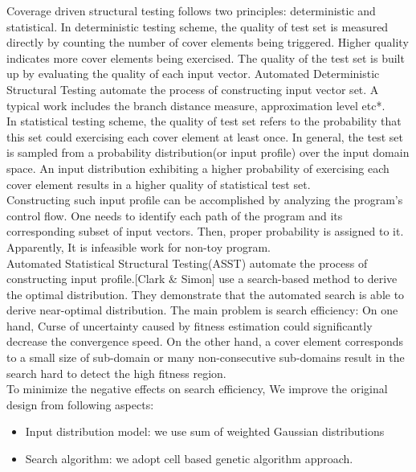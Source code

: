 \documentclass[conference]{IEEEtran}
\begin{document}
Coverage driven structural testing follows two principles: deterministic and statistical. In deterministic testing scheme, the quality of test set is measured directly by counting the number of cover elements being triggered. Higher quality indicates more cover elements being exercised. The quality of the test set is built up by evaluating the quality of each input vector. Automated Deterministic Structural Testing automate the process of constructing input vector set. A typical work includes the branch distance measure, approximation level etc*. \\  

In statistical testing scheme, the quality of test set refers to the probability that this set could exercising each cover element at least once. In general, the test set is sampled from a probability distribution(or input profile) over the input domain space. An input distribution exhibiting a higher probability of exercising each cover element results in a higher quality of statistical test set.\\

Constructing such input profile can be accomplished by analyzing the program's control flow. One needs to identify each path of the program and its corresponding subset of input vectors. Then, proper probability is assigned to it. Apparently, It is infeasible work for non-toy program. \\

Automated Statistical Structural Testing(ASST) automate the process of constructing input profile.[Clark \& Simon] use a search-based method to derive the optimal distribution. They demonstrate that the automated search is able to derive near-optimal distribution. The main problem is search efficiency: On one hand, Curse of uncertainty caused by fitness estimation could significantly decrease the convergence speed. On the other hand, a cover element corresponds to a small size of sub-domain or many non-consecutive sub-domains result in the search hard to detect the high fitness region.\\

To minimize the negative effects on search efficiency, We improve the original design from following aspects: 
\begin{itemize}
	\item Input distribution model: we use sum of weighted Gaussian distributions
	\item Search algorithm: we adopt cell based genetic algorithm approach.\\	
\end{itemize}
\end{document}

